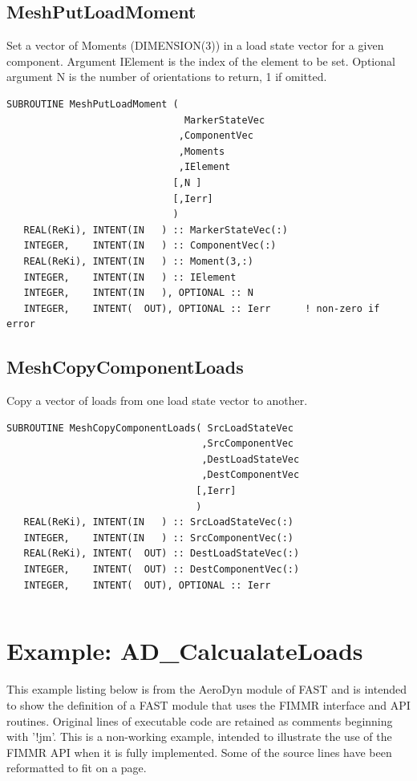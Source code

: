 \documentclass[11pt]{article}
\begin{document}
\subsection{MeshPutLoadMoment}
Set a vector of Moments (DIMENSION(3)) in a load state vector for a given component.
Argument IElement is the index of the element to be set.
Optional argument N is the number of orientations to return, 1 if omitted.
\begin{verbatim}
SUBROUTINE MeshPutLoadMoment ( 
                               MarkerStateVec
                              ,ComponentVec 
                              ,Moments
                              ,IElement
                             [,N ]
                             [,Ierr]
                             )
   REAL(ReKi), INTENT(IN   ) :: MarkerStateVec(:)
   INTEGER,    INTENT(IN   ) :: ComponentVec(:)
   REAL(ReKi), INTENT(IN   ) :: Moment(3,:)
   INTEGER,    INTENT(IN   ) :: IElement
   INTEGER,    INTENT(IN   ), OPTIONAL :: N
   INTEGER,    INTENT(  OUT), OPTIONAL :: Ierr 		! non-zero if error
\end{verbatim}

\subsection{MeshCopyComponentLoads}
Copy a vector of loads from one load state vector to another.
\begin{verbatim}
SUBROUTINE MeshCopyComponentLoads( SrcLoadStateVec
                                  ,SrcComponentVec
                                  ,DestLoadStateVec
                                  ,DestComponentVec
                                 [,Ierr]
                                 )
   REAL(ReKi), INTENT(IN   ) :: SrcLoadStateVec(:)
   INTEGER,    INTENT(IN   ) :: SrcComponentVec(:)
   REAL(ReKi), INTENT(  OUT) :: DestLoadStateVec(:)
   INTEGER,    INTENT(  OUT) :: DestComponentVec(:)
   INTEGER,    INTENT(  OUT), OPTIONAL :: Ierr
\end{verbatim}


\begin{verbatim}
\end{verbatim}


\section{Example: AD\_CalcualateLoads}
\label{sec:listing}

This example listing below is from the AeroDyn module of FAST and is intended to show
the definition of a FAST module that uses the FIMMR interface and API routines.
Original
lines of executable code are retained as comments beginning with '!jm'.  This is a non-working
example, intended to illustrate the use of the FIMMR API when it is fully implemented.
Some of the
source lines have been reformatted to fit on a page.  
\end{document}
